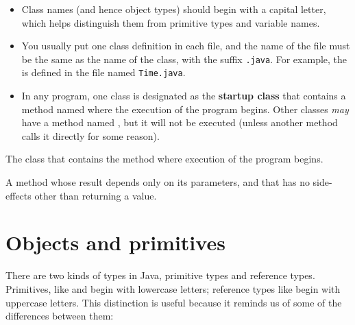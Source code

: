 \begin{itemize}

\item Class names (and hence object types) should begin with a capital letter, which helps distinguish them from primitive types and variable names.

\item You usually put one class definition in each file, and the name of the file must be the same as the name of the class, with the suffix {\tt .java}.
For example, the  is defined in the file named {\tt Time.java}.

\item In any program, one class is designated as the {\bf startup class} that contains a method named  where the execution of the program begins.
Other classes {\em may} have a method named , but it will not be executed (unless another method calls it directly for some reason).

\end{itemize}

The class that contains the  method where execution of the program begins.

A method whose result depends only on its parameters, and that has no side-effects other than returning a value.


\section{Objects and primitives}


There are two kinds of types in Java, primitive types and reference types.
Primitives, like  and  begin with lowercase letters; reference types like  begin with uppercase letters.
This distinction is useful because it reminds us of some of the differences between them:

